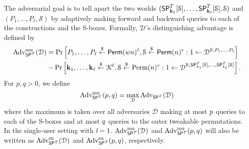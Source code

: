 The adversarial goal is to tell apart the two worlds $(\mathsf{SP}_{\mathbf{k}_1}^T[\mathcal{S}],\ldots,\mathsf{SP}_{\mathbf{k}_\ell}^T[\mathcal{S}],\mathcal{S})$ and $({P}_1,\ldots,{P}_{\ell},\mathcal{S})$ by adaptively making forward and backward queries to each
of the constructions and the S-boxes. Formally, $\mathcal{D}$'s distinguishing advantage is
defined by
%
$$
\begin{aligned}
\operatorname{Adv}_{\mathsf{SP}^T}^{\mathrm{mu}}(\mathcal{D}) &=\operatorname{Pr}\left[{P}_1,\ldots,{P}_{\ell} \stackrel{\$}{\leftarrow} {\mathsf{Perm}}(w n)^\ell, \mathcal{S} \stackrel{\$}{\leftarrow} \mathsf{Perm}(n)^{r}: 1 \leftarrow \mathcal{D}^{\mathcal{S}, {P}_{1}, \ldots, {P}_{\ell}}\right] \\
&-\operatorname{Pr}\left[\mathbf{k}_{1}, \ldots, \mathbf{k}_{\ell} \stackrel{\$}{\leftarrow} \mathcal{K}^{\ell}, \mathcal{S} \stackrel{\$}{\leftarrow} \operatorname{Perm}(n)^{r}: 1 \leftarrow \mathcal{D}^{\mathcal{S}, \mathsf{SP}_{k_{1}}^T[\mathcal{S}], \ldots, \mathsf{SP}_{k_{\ell}}^T[\mathcal{S}]}\right].
\end{aligned}
$$
%
For $p,q > 0$, we define
%
$$
\operatorname{Adv}^{\mathrm{mu}}_{\mathsf{SP}^T}(p, q) = \max _{\mathcal{D}} \operatorname{Adv}_{\mathsf{SP}^T}(\mathcal{D})
$$
%
where the maximum is taken over all adversaries $\mathcal{D}$ making at most $\mathnormal{p}$ queries to each of the S-boxes and at most $\mathnormal{q}$ queries to the outer tweakable permutations. In the single-user setting with $\emph{l} = 1$. $\operatorname{Adv}^{\mathrm{mu}}_{\mathsf{SP}^T}(\mathcal{D})$ and $\operatorname{Adv}^{\mathrm{mu}}_{\mathsf{SP}^T}(p, q)$  will also be written as $\operatorname{Adv}^{\mathrm{su}}_{\mathsf{SP}^T}(\mathcal{D})$ and $\operatorname{Adv}^{\mathrm{su}}_{\mathsf{SP}^T}(p, q)$, respectively.





\arrangespace

